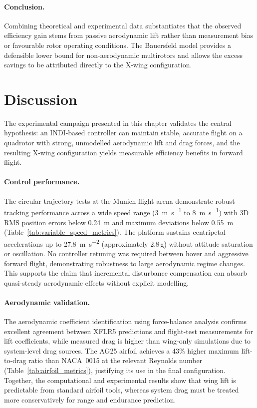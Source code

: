 \paragraph{Conclusion.}
Combining theoretical and experimental data substantiates that the observed efficiency gain stems from passive aerodynamic lift rather than measurement bias or favourable rotor operating conditions.
The Bauersfeld model provides a defensible lower bound for non-aerodynamic multirotors and allows the excess savings to be attributed directly to the X-wing configuration.

\section{Discussion}\label{sec:discussion}

The experimental campaign presented in this chapter validates the central hypothesis: an INDI-based controller can maintain stable, accurate flight on a quadrotor with strong, unmodelled aerodynamic lift and drag forces, and the resulting X-wing configuration yields measurable efficiency benefits in forward flight.

\paragraph{Control performance.}
The circular trajectory tests at the Munich flight arena demonstrate robust tracking performance across a wide speed range (\SI{3}{\meter\per\second} to \SI{8}{\meter\per\second}) with 3D RMS position errors below \SI{0.24}{\meter} and maximum deviations below \SI{0.55}{\meter} (Table~\ref{tab:variable_speed_metrics}).
The platform sustains centripetal accelerations up to \SI{27.8}{\meter\per\second\squared} (approximately 2.8\,g) without attitude saturation or oscillation.
No controller retuning was required between hover and aggressive forward flight, demonstrating robustness to large aerodynamic regime changes.
This supports the claim that incremental disturbance compensation can absorb quasi-steady aerodynamic effects without explicit modelling.

\paragraph{Aerodynamic validation.}
The aerodynamic coefficient identification using force-balance analysis confirms excellent agreement between XFLR5 predictions and flight-test measurements for lift coefficients, while measured drag is higher than wing-only simulations due to system-level drag sources.
The AG25 airfoil achieves a 43\% higher maximum lift-to-drag ratio than NACA~0015 at the relevant Reynolds number (Table~\ref{tab:airfoil_metrics}), justifying its use in the final configuration.
Together, the computational and experimental results show that wing lift is predictable from standard airfoil tools, whereas system drag must be treated more conservatively for range and endurance prediction.

